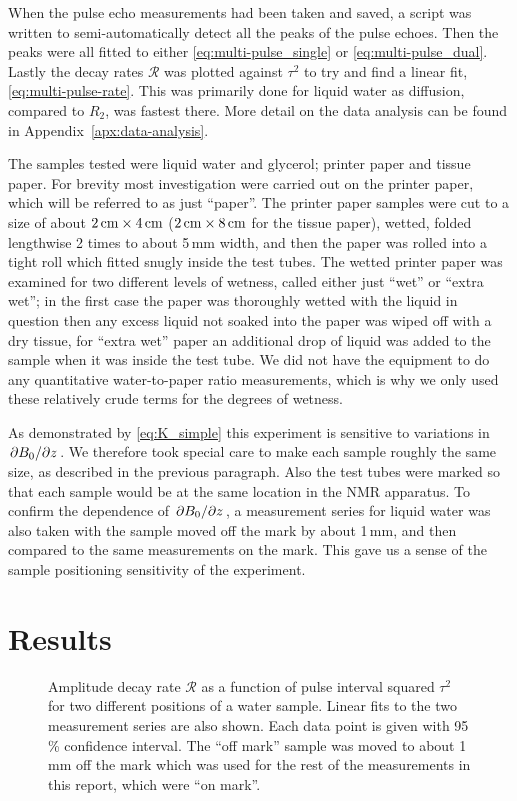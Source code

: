 \documentclass[11pt,a4paper, twocolumn,
swedish, english %
]{article}
\begin{document}
When the pulse echo measurements had been taken and saved, a script
was written to semi-automatically detect all the peaks
of the pulse echoes. Then the peaks were all fitted to either
\eqref{eq:multi-pulse_single} or \eqref{eq:multi-pulse_dual}.
Lastly the decay rates $\mathcal{R}$ was
plotted against $\tau^2$ to try and find a linear fit,
\eqref{eq:multi-pulse-rate}.
This was primarily done for liquid water as diffusion, compared to
$R_2$, was fastest there. More detail on the data analysis can be
found in Appendix~\ref{apx:data-analysis}.

The samples tested were liquid water and glycerol; 
printer paper and tissue paper. For brevity most investigation were
carried out on the printer paper, which will be referred to as just
``paper''. The printer paper samples were cut to a size of about  
$\unit[2]{cm}\times\unit[4]{cm}$ ($\unit[2]{cm}\times\unit[8]{cm}$ for
the tissue paper), wetted, folded lengthwise 2 times to about 5\,mm
width, and then the paper was rolled into a tight roll which fitted
snugly inside the test tubes.
The wetted printer paper was examined for two different levels of
wetness, called either just ``wet'' or ``extra wet''; in the first
case the paper was thoroughly wetted with the liquid in question then
any excess liquid not soaked into the paper was wiped off with a dry
tissue, for ``extra wet'' paper an additional drop of liquid was added
to the sample when it was inside the test tube. We did not have the
equipment to do any quantitative water-to-paper ratio measurements,
which is why we only used these relatively crude terms for the degrees
of wetness. 

As demonstrated by \eqref{eq:K_simple} this experiment is sensitive to
variations in $\pdv*{B_0}{z}$. We therefore took special care to make
each sample roughly the same size, as described in the previous
paragraph. Also the test tubes were marked so that each sample would 
be at the same location in the NMR apparatus. To confirm the
dependence of $\pdv*{B_0}{z}$, a measurement series for liquid water
was also taken with the sample moved off the mark by about 1\,mm, and
then compared to the same measurements on the mark. This gave us a
sense of the sample positioning sensitivity of the experiment. 



\section{Results}

\begin{figure}
\centering

\caption{Amplitude decay rate $\mathcal{R}$ as a function of pulse
  interval squared $\tau^2$ for two different positions of a water
  sample. Linear fits to the two measurement series are also
  shown. Each data point is given with 95\,\% confidence interval. The
  ``off mark'' sample was moved to about 1\,mm off the mark which was
  used for the rest of the measurements in this report, which were
  ``on mark''. } 
\label{fig:water-pos}
\end{figure}
\end{document}
